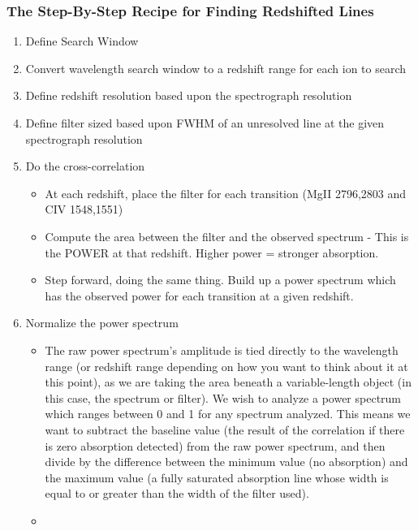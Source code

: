 \subsubsection{The Step-By-Step Recipe for Finding Redshifted Lines}
\label{ch3:steps}

\begin{enumerate}
\item Define Search Window
\item Convert wavelength search window to a redshift range for each ion to search
\item Define redshift resolution based upon the spectrograph resolution
\item Define filter sized based upon FWHM of an unresolved line at the given spectrograph resolution
\item Do the cross-correlation
\begin{itemize}
\item At each redshift, place the filter for each transition (MgII 2796,2803 and CIV 1548,1551)
\item Compute the area between the filter and the observed spectrum - This is the POWER at that redshift. Higher power = stronger absorption.
\item Step forward, doing the same thing. Build up a power spectrum which has the observed power for each transition at a given redshift.
\end{itemize}
\item Normalize the power spectrum
\begin{itemize}
\item The raw power spectrum's amplitude is tied directly to the wavelength range (or redshift range depending on how you want to think about it at this point), as we are taking the area beneath a variable-length object (in this case, the spectrum or filter). We wish to analyze a power spectrum which ranges between 0 and 1 for any spectrum analyzed. This means we want to subtract the baseline value (the result of the correlation if there is zero absorption detected) from the raw power spectrum, and then divide by the difference between the minimum value (no absorption) and the maximum value (a fully saturated absorption line whose width is equal to or greater than the width of the filter used).
\item
\end{itemize}
\end{enumerate}
